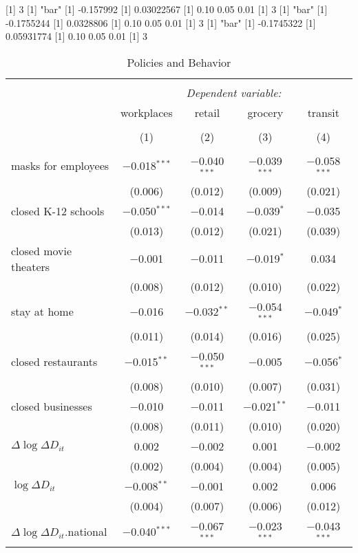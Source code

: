 [1] 3
[1] "bar"
[1] -0.157992
[1] 0.03022567
[1] 0.10 0.05 0.01
[1] 3
[1] "bar"
[1] -0.1755244
[1] 0.0328806
[1] 0.10 0.05 0.01
[1] 3
[1] "bar"
[1] -0.1745322
[1] 0.05931774
[1] 0.10 0.05 0.01
[1] 3

\begin{table}[!htbp] \centering 
  \caption{Policies and Behavior} 
  \label{} 
\begin{tabular}{@{\extracolsep{1pt}}lcccc} 
\\[-1.8ex]\hline 
\hline \\[-1.8ex] 
 & \multicolumn{4}{c}{\textit{Dependent variable:}} \\ 
\cline{2-5} 
 & workplaces & retail & grocery & transit \\ 
\\[-1.8ex] & (1) & (2) & (3) & (4)\\ 
\hline \\[-1.8ex] 
 masks for employees & $-$0.018$^{***}$ & $-$0.040$^{***}$ & $-$0.039$^{***}$ & $-$0.058$^{***}$ \\ 
  & (0.006) & (0.012) & (0.009) & (0.021) \\ 
  closed K-12 schools & $-$0.050$^{***}$ & $-$0.014 & $-$0.039$^{*}$ & $-$0.035 \\ 
  & (0.013) & (0.012) & (0.021) & (0.039) \\ 
  closed movie theaters & $-$0.001 & $-$0.011 & $-$0.019$^{*}$ & 0.034 \\ 
  & (0.008) & (0.012) & (0.010) & (0.022) \\ 
  stay at home & $-$0.016 & $-$0.032$^{**}$ & $-$0.054$^{***}$ & $-$0.049$^{*}$ \\ 
  & (0.011) & (0.014) & (0.016) & (0.025) \\ 
  closed restaurants & $-$0.015$^{**}$ & $-$0.050$^{***}$ & $-$0.005 & $-$0.056$^{*}$ \\ 
  & (0.008) & (0.010) & (0.007) & (0.031) \\ 
  closed businesses & $-$0.010 & $-$0.011 & $-$0.021$^{**}$ & $-$0.011 \\ 
  & (0.008) & (0.011) & (0.010) & (0.020) \\ 
  $\Delta \log \Delta D_{it}$ & 0.002 & $-$0.002 & 0.001 & $-$0.002 \\ 
  & (0.002) & (0.004) & (0.004) & (0.005) \\ 
  $\log \Delta D_{it}$ & $-$0.008$^{**}$ & $-$0.001 & 0.002 & 0.006 \\ 
  & (0.004) & (0.007) & (0.006) & (0.012) \\ 
  $\Delta \log \Delta D_{it}$.national & $-$0.040$^{***}$ & $-$0.067$^{***}$ & $-$0.023$^{***}$ & $-$0.043$^{***}$ \\ 

\end{tabular}
\end{table}
